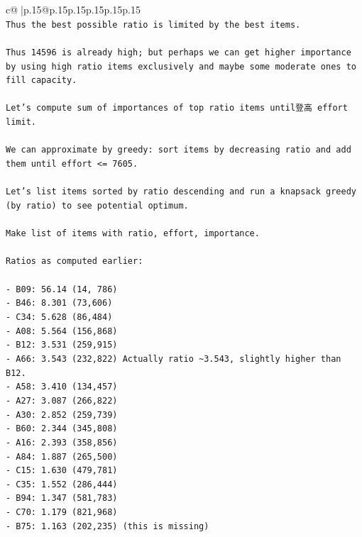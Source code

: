 \documentclass{article}
\begin{document}
{\begin{supertabular}{c@{$\;$}|p{.15\linewidth}@{}p{.15\linewidth}p{.15\linewidth}p{.15\linewidth}p{.15\linewidth}p{.15\linewidth}}
{{{\\ 
\texttt{Thus the best possible ratio is limited by the best items.} \\
\\ 
\texttt{Thus 14596 is already high; but perhaps we can get higher importance by using high ratio items exclusively and maybe some moderate ones to fill capacity.} \\
\\ 
\texttt{Let's compute sum of importances of top ratio items until登高 effort limit.} \\
\\ 
\texttt{We can approximate by greedy: sort items by decreasing ratio and add them until effort <= 7605.} \\
\\ 
\texttt{Let's list items sorted by ratio descending and run a knapsack greedy (by ratio) to see potential optimum.} \\
\\ 
\texttt{Make list of items with ratio, effort, importance.} \\
\\ 
\texttt{Ratios as computed earlier:} \\
\\ 
\texttt{{-} B09: 56.14 (14, 786)} \\
\texttt{{-} B46: 8.301 (73,606)} \\
\texttt{{-} C34: 5.628 (86,484)} \\
\texttt{{-} A08: 5.564 (156,868)} \\
\texttt{{-} B12: 3.531 (259,915)} \\
\texttt{{-} A66: 3.543 (232,822) Actually ratio \textasciitilde{}3.543, slightly higher than B12.} \\
\texttt{{-} A58: 3.410 (134,457)} \\
\texttt{{-} A27: 3.087 (266,822)} \\
\texttt{{-} A30: 2.852 (259,739)} \\
\texttt{{-} B60: 2.344 (345,808)} \\
\texttt{{-} A16: 2.393 (358,856)} \\
\texttt{{-} A84: 1.887 (265,500)} \\
\texttt{{-} C15: 1.630 (479,781)} \\
\texttt{{-} C35: 1.552 (286,444)} \\
\texttt{{-} B94: 1.347 (581,783)} \\
\texttt{{-} C70: 1.179 (821,968)} \\
\texttt{{-} B75: 1.163 (202,235) (this is missing)} \\
}}}
\end{supertabular}}
\end{document}
